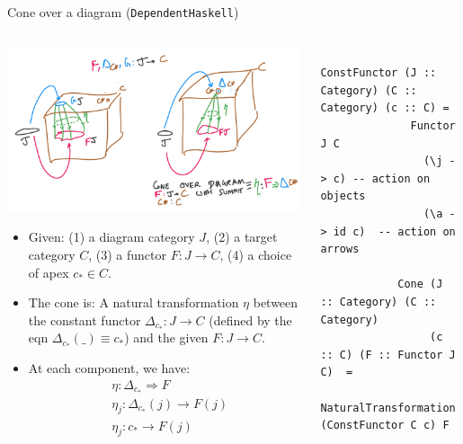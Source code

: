 \documentclass[8pt]{beamer}
\newcommand{\nt}{\Rightarrow}
\begin{document}
\begin{frame}[fragile]{Cone over a diagram (\texttt{DependentHaskell})}
    \begin{columns}[T] %
        \begin{column}{.48\textwidth}
            \includegraphics[width=\textwidth]{./cone.png}
    {\footnotesize
    \begin{itemize}
        \item Given: (1) a diagram category $J$, (2) a target category $C$, (3) a functor $F: J \to C$, (4)
              a choice of apex $c_* \in C$. 
        \item The cone is: A natural transformation $\eta$ between the constant functor $\Delta_{c_*}: J \to C$ 
            (defined by the eqn $\Delta_{c_*}(\_) \equiv c_*$) and the given $F: J \to C$. 
        \item At each component, we have:
            \begin{align*}
                &\eta: \Delta_{c_*} \nt F \\
                &\eta_j: \Delta_{c_*}(j) \to F(j) \\
                &\eta_j: c_* \to F(j) \\
            \end{align*}
    \end{itemize}
    }
    \end{column}

    \begin{column}{.6\textwidth}
        {\tiny
        \begin{verbatim}
            ConstFunctor (J :: Category) (C :: Category) (c :: C) = 
              Functor J C
                (\j -> c) -- action on objects
                (\a -> id c)  -- action on arrows

            Cone (J :: Category) (C :: Category) 
                 (c :: C) (F :: Functor J C)  = 
                   NaturalTransformation (ConstFunctor C c) F
        \end{verbatim}
        }
    \end{column}
    \end{columns}
\end{frame}
\end{document}
